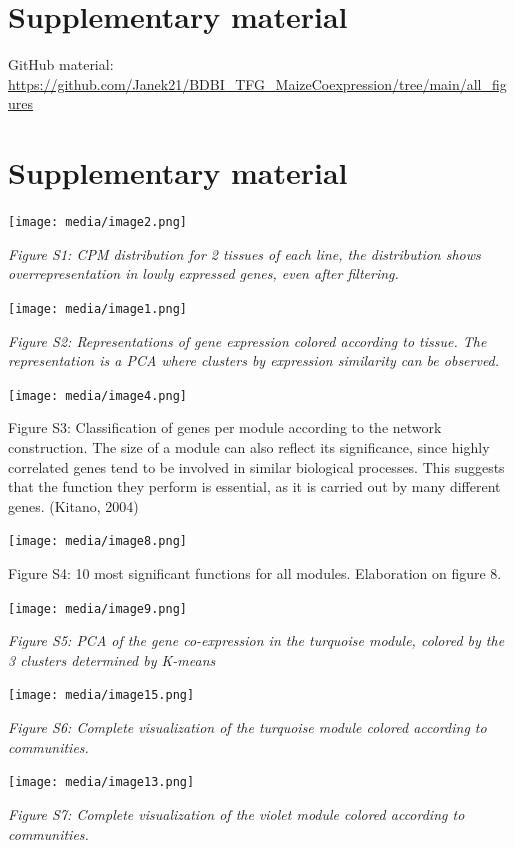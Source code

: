 \documentclass[
]{article}
\begin{document}
\hypertarget{supplementary-material}{%
\section{Supplementary material}\label{supplementary-material}}

GitHub material:
\href{https://github.com/Janek21/BDBI_TFG_MaizeCoexpression/tree/main/all_figures}{{https://github.com/Janek21/BDBI\_TFG\_MaizeCoexpression/tree/main/all\_figures}}

\hypertarget{supplementary-material-1}{%
\section{Supplementary material}\label{supplementary-material-1}}

\texttt{[image: media/image2.png]}

\emph{Figure S1: CPM distribution for 2 tissues of each line, the
distribution shows overrepresentation in lowly expressed genes, even
after filtering.}

\texttt{[image: media/image1.png]}

\emph{Figure S2: Representations of gene expression colored according to
tissue. The representation is a PCA where clusters by expression
similarity can be observed.}

\texttt{[image: media/image4.png]}

Figure S3: Classification of genes per module according to the network
construction. The size of a module can also reflect its significance,
since highly correlated genes tend to be involved in similar biological
processes. This suggests that the function they perform is essential, as
it is carried out by many different genes. (Kitano, 2004)

\texttt{[image: media/image8.png]}

Figure S4: 10 most significant functions for all modules. Elaboration on
figure 8.

\texttt{[image: media/image9.png]}

\emph{Figure S5: PCA of the gene co-expression in the turquoise module,
colored by the 3 clusters determined by K-means}

\texttt{[image: media/image15.png]}

\emph{Figure S6: Complete visualization of the turquoise module colored
according to communities.}

\texttt{[image: media/image13.png]}

\emph{Figure S7: Complete visualization of the violet module colored
according to communities.}
\end{document}
